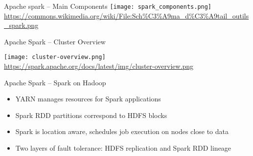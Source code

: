 \documentclass[ignorenonframetext,xcolor=x11names]{beamer}
\begin{document}
\begin{frame}{Apache spark -- Main Components}
\centering
\texttt{[image: spark\_components.png]}
\scriptsize \url{https://commons.wikimedia.org/wiki/File:Sch\%C3\%A9ma_d\%C3\%A9tail_outils_spark.png} \normalsize
\end{frame}

\begin{frame}{Apache Spark -- Cluster Overview}
\begin{center}
\texttt{[image: cluster-overview.png]}
\scriptsize \url{https://spark.apache.org/docs/latest/img/cluster-overview.png}
\end{center}
\end{frame}

\begin{frame}{Apache Spark -- Spark on Hadoop}
\begin{itemize}
   \item YARN manages resources for Spark applications
   \item Spark RDD partitions correspond to HDFS blocks
   \item Spark is location aware, schedules job execution on nodes close to data
   \item Two layers of fault tolerance: HDFS replication and Spark RDD lineage
\end{itemize}
\end{frame}
\end{document}
